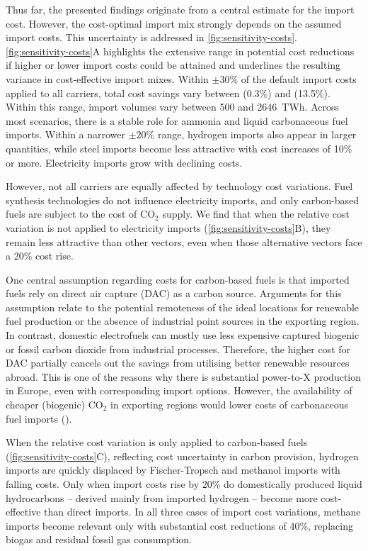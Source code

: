 Thus far, the presented findings originate from a central estimate for the
import cost. However, the cost-optimal import mix strongly depends on the
assumed import costs. This uncertainty is addressed in
\cref{fig:sensitivity-costs}. \cref{fig:sensitivity-costs}A highlights the
extensive range in potential cost reductions if higher or lower import costs
could be attained and underlines the resulting variance in cost-effective import
mixes. Within $\pm 30\%$ of the default import costs applied to all carriers,
total cost savings vary between  (0.3\%) and  (13.5\%).
Within this range, import volumes vary between 500 and 2646~TWh. Across most
scenarios, there is a stable role for ammonia and liquid carbonaceous fuel
imports. Within a narrower $\pm 20\%$ range, hydrogen imports also appear in
larger quantities, while steel imports become less attractive with cost
increases of 10\% or more. Electricity imports grow with declining costs.

However, not all carriers are equally affected by technology cost variations.
Fuel synthesis technologies do not influence electricity imports, and only
carbon-based fuels are subject to the cost of CO$_2$ supply. We find that when
the relative cost variation is not applied to electricity imports
(\cref{fig:sensitivity-costs}B), they remain less attractive than other
vectors, even when those alternative vectors face a 20\% cost rise.

One central assumption regarding costs for carbon-based fuels is that imported
fuels rely on direct air capture (DAC) as a carbon source. Arguments for this
assumption relate to the potential remoteness of the ideal locations for
renewable fuel production or the absence of industrial point sources in the
exporting region. In contrast, domestic electrofuels can mostly use less
expensive captured biogenic or fossil carbon dioxide from industrial processes.
Therefore, the higher cost for DAC partially cancels out the savings from
utilising better renewable resources abroad. This is one of the reasons why
there is substantial power-to-X production in Europe, even with corresponding
import options. However, the availability of cheaper (biogenic) CO$_2$ in
exporting regions would lower costs of carbonaceous fuel imports
().

When the relative cost variation is only applied to carbon-based fuels
(\cref{fig:sensitivity-costs}C), reflecting cost uncertainty in carbon
provision, hydrogen imports are quickly displaced by Fischer-Tropsch and
methanol imports with falling costs. Only when import costs rise by 20\% do
domestically produced liquid hydrocarbons -- derived mainly from imported
hydrogen -- become more cost-effective than direct imports. In all three cases
of import cost variations, methane imports become relevant only with substantial
cost reductions of 40\%, replacing biogas and residual fossil gas consumption.


